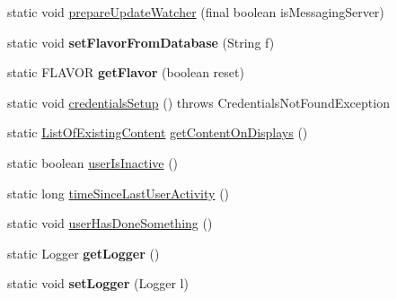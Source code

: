 \begin{DoxyCompactItemize}
\item 
static void \hyperlink{classgov_1_1fnal_1_1ppd_1_1dd_1_1GlobalVariables_a7a261637e9a06bba925ba4901ecf4479}{prepare\-Update\-Watcher} (final boolean is\-Messaging\-Server)
\item 
\hypertarget{classgov_1_1fnal_1_1ppd_1_1dd_1_1GlobalVariables_a199ba3417f9d46d69c2083e3c782d85e}{static void {\bfseries set\-Flavor\-From\-Database} (String f)}\label{classgov_1_1fnal_1_1ppd_1_1dd_1_1GlobalVariables_a199ba3417f9d46d69c2083e3c782d85e}

\item 
\hypertarget{classgov_1_1fnal_1_1ppd_1_1dd_1_1GlobalVariables_a43d1f44dce5ac77b0d03e3c58a8f9533}{static F\-L\-A\-V\-O\-R {\bfseries get\-Flavor} (boolean reset)}\label{classgov_1_1fnal_1_1ppd_1_1dd_1_1GlobalVariables_a43d1f44dce5ac77b0d03e3c58a8f9533}

\item 
static void \hyperlink{classgov_1_1fnal_1_1ppd_1_1dd_1_1GlobalVariables_a3beb933e8664bc5cf625f37d4e0ad429}{credentials\-Setup} ()  throws Credentials\-Not\-Found\-Exception 
\item 
static \hyperlink{classgov_1_1fnal_1_1ppd_1_1dd_1_1changer_1_1ListOfExistingContent}{List\-Of\-Existing\-Content} \hyperlink{classgov_1_1fnal_1_1ppd_1_1dd_1_1GlobalVariables_a5dee2a221fa2d94a5baa8558800845e3}{get\-Content\-On\-Displays} ()
\item 
static boolean \hyperlink{classgov_1_1fnal_1_1ppd_1_1dd_1_1GlobalVariables_aba515ddabffe804f9830689e02ef0cda}{user\-Is\-Inactive} ()
\item 
static long \hyperlink{classgov_1_1fnal_1_1ppd_1_1dd_1_1GlobalVariables_a7480064c523e0ebb558122616d32544f}{time\-Since\-Last\-User\-Activity} ()
\item 
static void \hyperlink{classgov_1_1fnal_1_1ppd_1_1dd_1_1GlobalVariables_a526d778baf99fcb1eb1648e91c5e346d}{user\-Has\-Done\-Something} ()
\item 
\hypertarget{classgov_1_1fnal_1_1ppd_1_1dd_1_1GlobalVariables_a5f0114f559702931f77f0e571be95752}{static Logger {\bfseries get\-Logger} ()}\label{classgov_1_1fnal_1_1ppd_1_1dd_1_1GlobalVariables_a5f0114f559702931f77f0e571be95752}

\item 
\hypertarget{classgov_1_1fnal_1_1ppd_1_1dd_1_1GlobalVariables_a14e776ad97d0c10931fd61205c9d2b6f}{static void {\bfseries set\-Logger} (Logger l)}\label{classgov_1_1fnal_1_1ppd_1_1dd_1_1GlobalVariables_a14e776ad97d0c10931fd61205c9d2b6f}

\end{DoxyCompactItemize}
